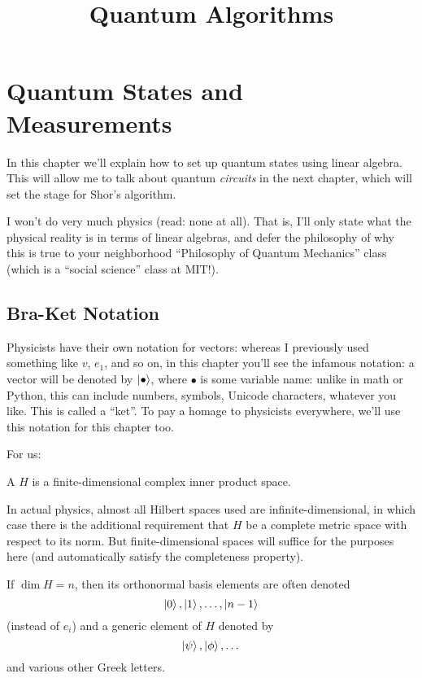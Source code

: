 \documentclass[11pt]{scrreprt}
\begin{document}
\title{Quantum Algorithms}
\maketitle

\chapter{Quantum States and Measurements}
In this chapter we'll explain how to set up quantum states using
linear algebra. This will allow me to talk about quantum \emph{circuits}
in the next chapter, which will set the stage for Shor's algorithm.

I won't do very much physics (read: none at all).
That is, I'll only state what the physical reality is in terms
of linear algebras, and defer the philosophy of why this is true
to your neighborhood ``Philosophy of Quantum Mechanics'' class
(which is a ``social science'' class at MIT!).

\section{Bra-Ket Notation}
Physicists have their own notation for vectors:
whereas I previously used something like $v$, $e_1$, and so on,
in this chapter you'll see the infamous  notation:
a vector will be denoted by $\ket\bullet$, where $\bullet$ is some
variable name: unlike in math or Python, this can include
numbers, symbols, Unicode characters, whatever you like.
This is called a ``ket''.
To pay a homage to physicists everywhere,
we'll use this notation for this chapter too.

For us:
\begin{definition}
	A  $H$ is a finite-dimensional
	complex inner product space.
\end{definition}
\begin{abuse}
	In actual physics, almost all Hilbert spaces used
	are infinite-dimensional, in which case there is 
	the additional requirement that $H$ be a complete metric
	space with respect to its norm. But finite-dimensional spaces
	will suffice for the purposes here
	(and automatically satisfy the completeness property).
\end{abuse}

If $\dim H = n$, then its orthonormal basis elements are often denoted
\[ \ket0, \ket1, \dots, \ket{n-1} \]
(instead of $e_i$)
and a generic element of $H$ denoted by
\[ \ket\psi, \ket\phi, \dots \]
and various other Greek letters.
\end{document}
